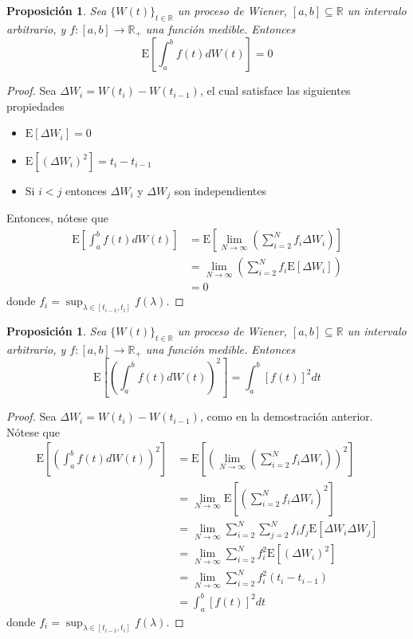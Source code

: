 \documentclass[12pt,letterpaper]{book}
\newtheorem{proposicion}[teorema]{Proposición}
\newcommand{\R}{\mathbb{R}}
\newcommand{\E}[1]{\mathrm{E}\left[ #1 \right]}
\begin{document}
\begin{proposicion}
Sea $\{ W(t)\}_{t\in\R}$ un proceso de Wiener, $[a,b]\subseteq\R$ un intervalo arbitrario, y $f:[a,b]\longrightarrow\R_+$ una función medible. Entonces
\begin{equation}
\E{\int_a^b f(t) dW(t) } = 0
\end{equation}
\label{prop:lazy000}
\end{proposicion}
\begin{proof}
Sea $\Delta W_i = W(t_i) - W(t_{i-1})$, el cual satisface las siguientes propiedades
\begin{itemize}
\item $\E{\Delta W_i} = 0$
\item $\E{\left( \Delta W_i \right)^2} = t_{i} - t_{i-1}$
\item Si $i<j$ entonces $\Delta W_i$ y $\Delta W_j$ son independientes
\end{itemize} 

Entonces, nótese que
\begin{align*}
\E{\int_a^b f(t) dW(t) } &=
\E{ \lim_{N\rightarrow \infty} \left( \sum_{i=2}^N f_i \Delta W_i \right) } \\
&= 
\lim_{N\rightarrow \infty} \left( \sum_{i=2}^N f_i \E{ \Delta W_i } \right) \\
&= 0
\end{align*}
donde $f_i = \sup_{\lambda \in [t_{i-1},t_i]} f(\lambda)$.
\end{proof}

\begin{proposicion}
Sea $\{ W(t)\}_{t\in\R}$ un proceso de Wiener, $[a,b]\subseteq\R$ un intervalo arbitrario, y $f:[a,b]\longrightarrow\R_+$ una función medible. Entonces
\begin{equation}
\E{\left(\int_a^b f(t) dW(t) \right)^2 } = \int_a^b \left[ f(t) \right]^2 dt
\end{equation}
\label{prop:lazy100}
\end{proposicion}
\begin{proof}
Sea $\Delta W_i = W(t_i) - W(t_{i-1})$, como en la demostración anterior.
Nótese que
\begin{align*}
\E{\left(\int_a^b f(t) dW(t) \right)^2 } &=
\E{\left( \lim_{N\rightarrow \infty} \left(
\sum_{i=2}^N f_i \Delta W_i \right) \right)^2} \\
&= 
\lim_{N\rightarrow \infty} \E{ \left(
\sum_{i=2}^N f_i \Delta W_i \right)^2} \\
&=
\lim_{N\rightarrow \infty} \sum_{i=2}^N \sum_{j=2}^N
f_i f_j \E{  \Delta W_i \Delta W_j } \\
&=
\lim_{N\rightarrow \infty} \sum_{i=2}^N
f_i^2 \E{  \left( \Delta W_i \right)^2 } \\
&=
\lim_{N\rightarrow \infty} \sum_{i=2}^N
f_i^2 (t_i-t_{i-1}) \\
&=
\int_a^b \left[ f(t) \right]^2 dt
\end{align*}
donde $f_i = \sup_{\lambda \in [t_{i-1},t_i]} f(\lambda)$.
\end{proof}
\end{document}

